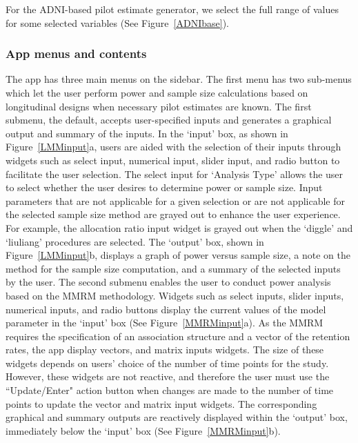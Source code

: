 For the ADNI-based pilot estimate generator, we select the full range of values for some selected variables (See Figure~\ref{ADNIbase}). 

\subsubsection{App menus and contents}
The app has three main menus on the sidebar. The first menu has two sub-menus which let the user perform power and sample size calculations based on longitudinal designs when necessary pilot estimates are known. The first submenu, the default, accepts user-specified inputs and generates a graphical output and summary of the inputs. In the `input' box, as shown in Figure~\ref{LMMinput}a, users are aided with the selection of their inputs through widgets such as select input, numerical input, slider input, and radio button to facilitate the user selection. The select input for `Analysis Type' allows the user to select whether the user desires to determine power or sample size. Input parameters that are not applicable for a given selection or are not applicable for the selected sample size method are grayed out to enhance the user experience. For example, the allocation ratio input widget is grayed out when the `diggle' and `liuliang' procedures are selected. The `output' box, shown in Figure~\ref{LMMinput}b, displays a graph of power versus sample size, a note on the method for the sample size computation, and a summary of the selected inputs by the user. The second submenu enables the user to conduct power analysis based on the MMRM methodology. Widgets such as select inputs, slider inputs, numerical inputs, and radio buttons display the current values of the model parameter in the `input' box (See Figure~\ref{MMRMinput}a). As the MMRM requires the specification of an association structure and a vector of the retention rates, the app display vectors, and matrix inputs widgets. The size of these widgets depends on users' choice of the number of time points for the study. However, these widgets are not reactive, and therefore the user must use the ``Update/Enter" action button when changes are made to the number of time points to update the vector and matrix input widgets. The corresponding graphical and summary outputs are reactively displayed within the `output' box, immediately below the `input’ box (See Figure~\ref{MMRMinput}b). 

